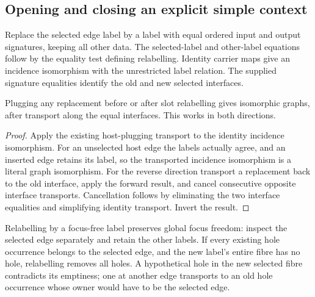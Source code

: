 \subsection{Opening and closing an explicit simple context}
\begin{definition}\label{term:slot-relabelling}
Replace the selected edge label by a label with equal ordered input and output
signatures, keeping all other data. The selected-label and other-label equations
follow by the equality test defining relabelling. Identity carrier maps give
an incidence isomorphism with the unrestricted label relation. The supplied
signature equalities identify the old and new selected interfaces.
\end{definition}
\begin{theorem}
Plugging any replacement before or after slot relabelling gives isomorphic
graphs, after transport along the equal interfaces. This works in both directions.
\end{theorem}
\begin{proof}
Apply the existing host-plugging transport to the identity incidence
isomorphism. For an unselected host edge the labels actually agree, and an
inserted edge retains its label, so the transported incidence isomorphism is
a literal graph isomorphism. For the reverse direction transport a replacement
back to the old interface, apply the forward result, and cancel consecutive
opposite interface transports. Cancellation follows by eliminating the two
interface equalities and simplifying identity transport. Invert the result.
\end{proof}
Relabelling by a focus-free label preserves global focus freedom: inspect the
selected edge separately and retain the other labels. If every existing hole
occurrence belongs to the selected edge, and the new label's entire fibre
has no hole, relabelling removes all holes. A hypothetical hole in the new
selected fibre contradicts its emptiness; one at another edge transports to
an old hole occurrence whose owner would have to be the selected edge.

